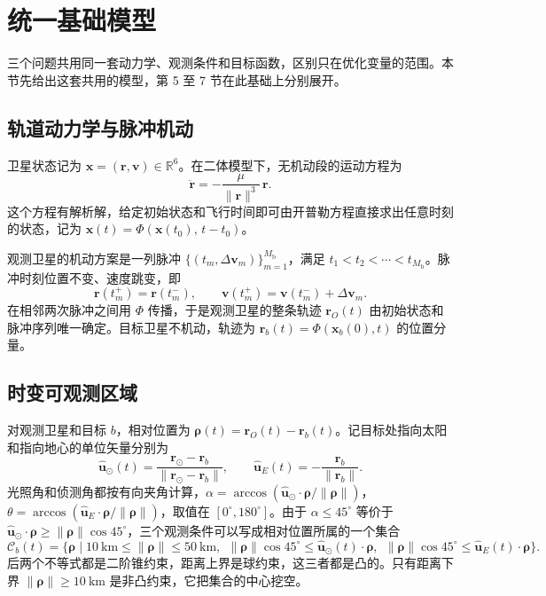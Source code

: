 \section{统一基础模型}

三个问题共用同一套动力学、观测条件和目标函数，区别只在优化变量的范围。本节先给出这套共用的模型，第 5 至 7 节在此基础上分别展开。

\subsection{轨道动力学与脉冲机动}

卫星状态记为 $\bm x = (\bm r, \bm v) \in \mathbb R^6$。在二体模型下，无机动段的运动方程为
\begin{equation}
  \ddot{\bm r} = -\frac{\mu}{\|\bm r\|^3}\,\bm r .
  \label{eq:twobody}
\end{equation}
这个方程有解析解，给定初始状态和飞行时间即可由开普勒方程直接求出任意时刻的状态，记为 $\bm x(t) = \Phi(\bm x(t_0),\, t - t_0)$。

观测卫星的机动方案是一列脉冲 $\{(t_m, \Delta\bm v_m)\}_{m=1}^{M_{\mathrm{b}}}$，满足 $t_1 < t_2 < \cdots < t_{M_{\mathrm{b}}}$。脉冲时刻位置不变、速度跳变，即
\begin{equation}
  \bm r(t_m^+) = \bm r(t_m^-), \qquad \bm v(t_m^+) = \bm v(t_m^-) + \Delta\bm v_m .
  \label{eq:impulse}
\end{equation}
在相邻两次脉冲之间用 $\Phi$ 传播，于是观测卫星的整条轨迹 $\bm r_O(t)$ 由初始状态和脉冲序列唯一确定。目标卫星不机动，轨迹为 $\bm r_b(t) = \Phi(\bm x_b(0), t)$ 的位置分量。

\subsection{时变可观测区域}

对观测卫星和目标 $b$，相对位置为 $\bm\rho(t) = \bm r_O(t) - \bm r_b(t)$。记目标处指向太阳和指向地心的单位矢量分别为
\begin{equation}
  \hat{\bm u}_\odot(t) = \frac{\bm r_\odot - \bm r_b}{\|\bm r_\odot - \bm r_b\|}, \qquad
  \hat{\bm u}_E(t) = -\frac{\bm r_b}{\|\bm r_b\|} .
  \label{eq:unitvec}
\end{equation}
光照角和侦测角都按有向夹角计算，$\alpha = \arccos(\hat{\bm u}_\odot\cdot\bm\rho/\|\bm\rho\|)$，$\theta = \arccos(\hat{\bm u}_E\cdot\bm\rho/\|\bm\rho\|)$，取值在 $[0^\circ, 180^\circ]$。由于 $\alpha \le 45^\circ$ 等价于 $\hat{\bm u}_\odot\cdot\bm\rho \ge \|\bm\rho\|\cos 45^\circ$，三个观测条件可以写成相对位置所属的一个集合
\begin{equation}
  \mathcal C_b(t) = \Big\{\bm\rho \;\Big|\; 10~\mathrm{km} \le \|\bm\rho\| \le 50~\mathrm{km},\ \
  \|\bm\rho\|\cos 45^\circ \le \hat{\bm u}_\odot(t)\cdot\bm\rho,\ \
  \|\bm\rho\|\cos 45^\circ \le \hat{\bm u}_E(t)\cdot\bm\rho \Big\} .
  \label{eq:feasset}
\end{equation}
后两个不等式都是二阶锥约束，距离上界是球约束，这三者都是凸的。只有距离下界 $\|\bm\rho\| \ge 10~\mathrm{km}$ 是非凸约束，它把集合的中心挖空。

